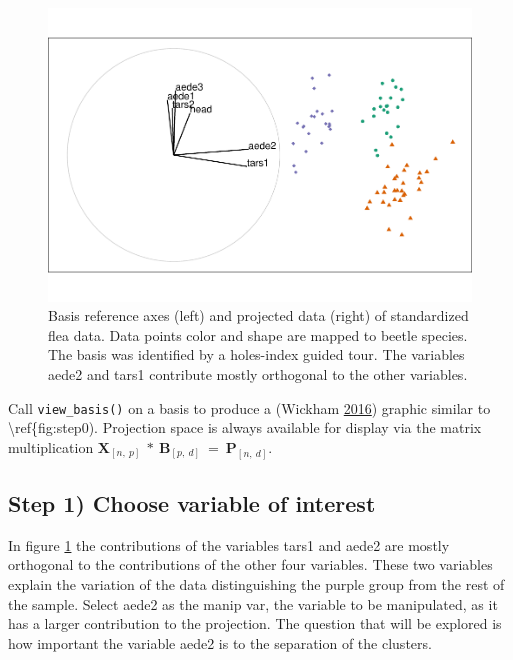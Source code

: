 \begin{Schunk}
\begin{figure}

{\centering \includegraphics[width=0.7\linewidth]{spinifex_paper_files/figure-latex/step0-1} 

}

\caption[Basis reference axes (left) and projected data (right) of standardized flea data]{Basis reference axes (left) and projected data (right) of standardized flea data. Data points color and shape are mapped to beetle species. The basis was identified by a holes-index guided tour. The variables aede2 and tars1 contribute mostly orthogonal to the other variables.}\label{fig:step0}
\end{figure}
\end{Schunk}

Call \texttt{view\_basis()} on a basis to produce a 
(Wickham \protect\hyperlink{ref-wickham_ggplot2:_2016}{2016}) graphic
similar to \textbackslash ref\{fig:step0). Projection space is always
available for display via the matrix multiplication
\(\textbf{X}_{[n,~p]} ~*~ \textbf{B}_{[p,~d]} ~=~ \textbf{P}_{[n,~d]}\).

\hypertarget{step-1-choose-variable-of-interest}{%
\subsection{Step 1) Choose variable of
interest}\label{step-1-choose-variable-of-interest}}

In figure \ref{fig:step0} the contributions of the variables tars1 and
aede2 are mostly orthogonal to the contributions of the other four
variables. These two variables explain the variation of the data
distinguishing the purple group from the rest of the sample. Select
aede2 as the manip var, the variable to be manipulated, as it has a
larger contribution to the projection. The question that will be
explored is how important the variable aede2 is to the separation of the
clusters.

